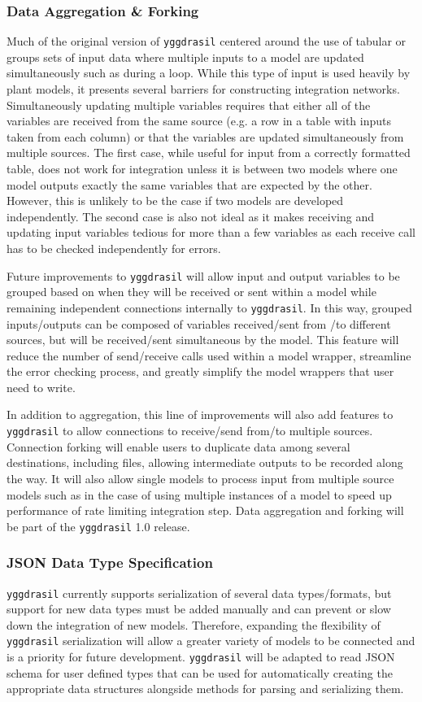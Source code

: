 \documentclass[journal]{IEEEtran}
\newcommand{\pkg}{{\tt yggdrasil}{}}
\begin{document}
\subsubsection{Data Aggregation \& Forking}\label{SS:dataagg}
%
Much of the original version of {\pkg} centered around the use of tabular or groups sets of input data where multiple inputs to a model are updated simultaneously such as during a loop. While this type of input is used heavily by plant models, it presents several barriers for constructing integration networks. Simultaneously updating multiple variables requires that either all of the variables are received from the same source (e.g. a row in a table with inputs taken from each column) or that the variables are updated simultaneously from multiple sources. The first case, while useful for input from a correctly formatted table, does not work for integration unless it is between two models where one model outputs exactly the same variables that are expected by the other. However, this is unlikely to be the case if two models are developed independently. The second case is also not ideal as it makes receiving and updating input variables tedious for more than a few variables as each receive call has to be checked independently for errors. 

Future improvements to {\pkg} will allow input and output variables to be grouped based on when they will be received or sent within a model while remaining independent connections internally to {\pkg}. In this way, grouped inputs/outputs can be composed of variables received/sent from /to different sources, but will be received/sent simultaneous by the model. This feature will reduce the number of send/receive calls used within a model wrapper, streamline the error checking process, and greatly simplify the model wrappers that user need to write.

In addition to aggregation, this line of improvements will also add features to {\pkg} to allow connections to receive/send from/to multiple sources. Connection forking will enable users to duplicate data among several destinations, including files, allowing intermediate outputs to be recorded along the way. It will also allow single models to process input from multiple source models such as in the case of using multiple instances of a model to speed up performance of rate limiting integration step.
%
Data aggregation and forking will be part of the {\pkg} 1.0 release.

\subsubsection{JSON Data Type Specification}\label{SS:json}
%
{\pkg} currently supports serialization of several data types/formats, but support for new data types must be added manually and can prevent or slow down the integration of new models. Therefore, expanding the flexibility of {\pkg} serialization will allow a greater variety of models to be connected and is a priority for future development. {\pkg} will be adapted to read JSON schema \citep{jsonschema} for user defined types that can be used for automatically creating the appropriate data structures alongside methods for parsing and serializing them. 
\end{document}
